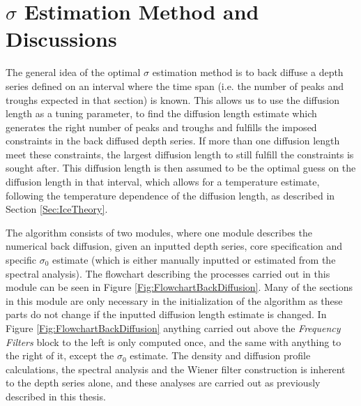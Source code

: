 \documentclass[../../CompleteThesis2/Complete_2ndDraft]{subfiles}
\begin{document}
\section[$\sigma$ Estimation Method][$\sigma$ Estimation Method]{$\sigma$ Estimation Method and Discussions}
\label{Sec:Method_SigmaMethod}


The general idea of the optimal $\sigma$ estimation method is to back diffuse a depth series defined on an interval where the time span (i.e. the number of peaks and troughs expected in that section) is known. This allows us to use the diffusion length as a tuning parameter, to find the diffusion length estimate which generates the right number of peaks and troughs and fulfills the imposed constraints in the back diffused depth series. If more than one diffusion length meet these constraints, the largest diffusion length to still fulfill the constraints is sought after. This diffusion length is then assumed to be the optimal guess on the diffusion length in that interval, which allows for a temperature estimate, following the temperature dependence of the diffusion length, as described in Section \ref{Sec:IceTheory}.

The algorithm consists of two modules, where one module describes the numerical back diffusion, given an inputted depth series, core specification and specific $\sigma_0$ estimate (which is either manually inputted or estimated from the spectral analysis). The flowchart describing the processes carried out in this module can be seen in Figure \ref{Fig:FlowchartBackDiffusion}. Many of the sections in this module are only necessary in the initialization of the algorithm as these parts do not change if the inputted diffusion length estimate is changed. In Figure \ref{Fig:FlowchartBackDiffusion} anything carried out above the \textit{Frequency Filters} block to the left is only computed once, and the same with anything to the right of it, except the $\sigma_0$ estimate. The density and diffusion profile calculations, the spectral analysis and the Wiener filter construction is inherent to the depth series alone, and these analyses are carried out as previously described in this thesis.
\end{document}
